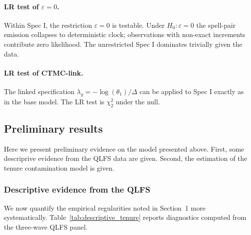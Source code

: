 \paragraph{LR test of \(\varepsilon = 0\).} Within Spec I, the restriction
\(\varepsilon = 0\) is testable. Under \(H_0: \varepsilon = 0\) the spell-pair
emission collapses to deterministic clock; observations with non-exact
increments contribute zero likelihood. The unrestricted Spec I dominates
trivially given the data.

\paragraph{LR test of CTMC-link.} The linked specification \(\lambda_g = -\log(\theta_1)/\Delta\)
can be applied to Spec I exactly as in the base model. The LR test is
\(\chi^2_2\) under the null.

\subsection{Preliminary results}
\label{sec:preliminary_results}
Here we present preliminary evidence on the model presented above. 
First, some descriprive evidence from the QLFS data are given. 
Second, the estimation of the tenure contamination model is given. 

\subsubsection{Descriptive evidence from the QLFS}

We now quantify the empirical regularities noted in Section~1 more
systematically. Table~\ref{tab:descriptive_tenure} reports diagnostics
computed from the three-wave QLFS panel.

